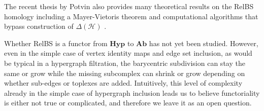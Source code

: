 \documentclass{amsart}
\newcommand{\Ab}{\mathrm{\textbf{Ab}}}
\newcommand{\Hyp}{\mathrm{\textbf{Hyp}}}
\renewcommand{\H}{\mathcal{H}}
\begin{document}
The recent thesis by Potvin also provides many theoretical results on the RelBS homology including a Mayer-Vietoris theorem \cite[Theorems 4.1.1 and 4.1.3]{potvin2023hypergraphs} and computational algorithms that bypass construction of $\Delta(\H)$ \cite[Section 5.2]{potvin2023hypergraphs}. 

Whether RelBS is a functor from $\Hyp$ to $\Ab$ has not yet been studied. However, even in the simple case of vertex identity maps and edge set inclusion, as would be typical in a hypergraph filtration, the barycentric subdivision can stay the same or grow while the missing subcomplex can shrink or grow depending on whether sub-edges or toplexes are added. Intuitively, this level of complexity already in the simple case of hypergraph inclusion leads us to believe functoriality is either not true or complicated, and therefore we leave it as an open question.

\end{document}
